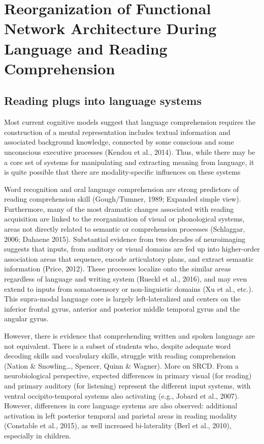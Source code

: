 \chapter{Reorganization of Functional Network Architecture During Language and Reading Comprehension}

\section{Reading plugs into language systems}
Most current cognitive models suggest that language comprehension requires the construction of a mental representation includes textual information and associated background knowledge, connected by some conscious and some unconscious executive processes (Kendou et al., 2014). Thus, while there may be a core set of systems for manipulating and extracting meaning from language, it is quite possible that there are modality-specific influences on these systems 

Word recognition and oral language comprehension are strong predictors of reading comprehension skill (Gough/Tumner, 1989; Expanded simple view). Furthermore, many of the most dramatic changes associated with reading acquisition are linked to the reorganization of visual or phonological systems, areas not directly related to semantic or comprehension processes (Schlaggar, 2006; Dahaene 2015). Substantial evidence from two decades of neuroimaging suggests that inputs, from auditory or visual domains are fed up into higher-order association areas that sequence, encode articulatory plans, and extract semantic information (Price, 2012). These processes localize onto the similar areas regardless of language and writing system (Rueckl et al., 2016), and may even extend to inputs from somatosensory or non-linguistic domains (Xu et al., etc.). This supra-modal language core is largely left-lateralized and centers on the inferior frontal gyrus, anterior and posterior middle temporal gyrus and the angular gyrus. 

However, there is evidence that comprehending written and spoken language are not equivalent. There is a subset of students who, despite adequate word decoding skills and vocabulary skills, struggle with reading comprehension (Nation \& Snowling…, Spencer, Quinn \& Wagner). More on SRCD. From a neurobiological perspective, expected differences in primary visual (for reading) and primary auditory (for listening) represent the different input systems, with ventral occipito-temporal systems also activating (e.g., Jobard et al., 2007). However, differences in core language systems are also observed: additional activation in left posterior temporal and parietal areas in reading modality (Constable et al., 2015), as well increased bi-laterality (Berl et al., 2010), especially in children. 

